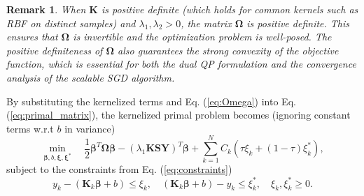 \documentclass[a4paper]{cas-sc}
\newtheorem{remark}{Remark}
\begin{document}
\begin{remark}
When $\boldsymbol{K}$ is positive definite (which holds for common kernels such as RBF on distinct samples) and $\lambda_1, \lambda_2 > 0$, the matrix $\boldsymbol{\Omega}$ is positive definite. This ensures that $\boldsymbol{\Omega}$ is invertible and the optimization problem is well-posed. The positive definiteness of $\boldsymbol{\Omega}$ also guarantees the strong convexity of the objective function, which is essential for both the dual QP formulation and the convergence analysis of the scalable SGD algorithm.
\end{remark}
By substituting the kernelized terms and Eq. (\ref{eq:Omega}) into Eq. (\ref{eq:primal_matrix}), the kernelized primal problem becomes (ignoring constant terms w.r.t $b$ in variance)
\begin{equation}
\label{eq:kernel_primal}
\min_{\boldsymbol{\beta}, b, \boldsymbol{\xi}, \boldsymbol{\xi}^*} \quad \frac{1}{2} \boldsymbol{\beta}^T \boldsymbol{\Omega} \boldsymbol{\beta} - (\lambda_1 \boldsymbol{K} \mathbf{S} \boldsymbol{Y})^T \boldsymbol{\beta} + \sum_{k=1}^N C_k (\tau \xi_k + (1-\tau)\xi_k^*),
\end{equation}
subject to the constraints from Eq. (\ref{eq:constraints})
\begin{equation}
\label{eq:kernel_constraints}
y_k - (\boldsymbol{K}_k \boldsymbol{\beta} + b) \le \xi_k, \quad (\boldsymbol{K}_k \boldsymbol{\beta} + b) - y_k \le \xi_k^*, \quad \xi_k, \xi_k^* \ge 0.
\end{equation}
\end{document}
